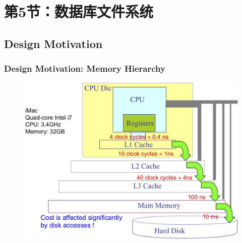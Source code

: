 \section{第5节：数据库文件系统} %
\subsection{Design Motivation} %

\begin{frame}[fragile]
    \frametitle{Design Motivation: Memory Hierarchy}
    \begin{figure}
        \includegraphics[width=0.6\linewidth]{figs/dbfile-mem-hierarchy.jpg}
    \end{figure}
\end{frame}

